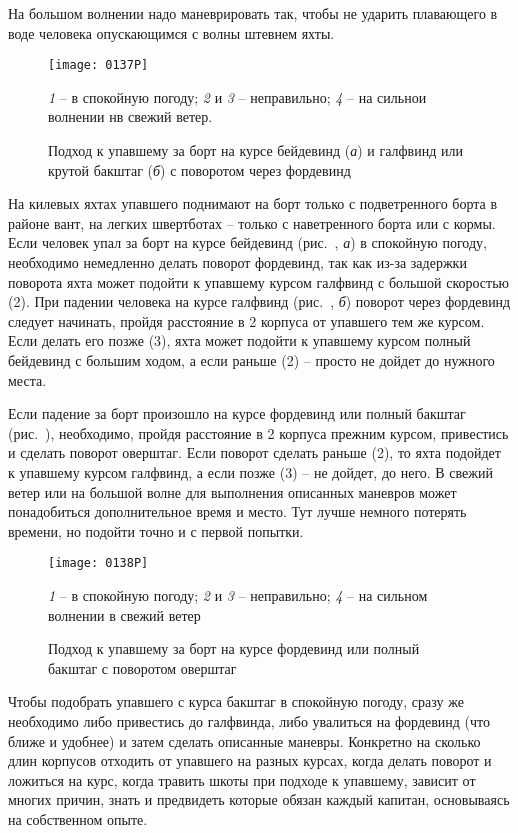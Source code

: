 На большом волнении надо маневрировать так, чтобы не ударить плавающего в воде человека опускающимся с волны штевнем яхты.

\begin{figure*}[htb]
  \centering{}
  \texttt{[image: 0137P]}
  \caption{Подход к упавшему за борт на курсе бейдевинд (\textit{а}) и галфвинд или крутой бакштаг (\textit{б}) с поворотом через фордевинд}
  \label{fig:137}
  \small
  \centering{}
  \textit{1} \--- в спокойную погоду; \textit{2} и \textit{3} \--- неправильно; \textit{4} \--- на сильнои волнении нв свежий ветер.
\end{figure*}

На килевых яхтах упавшего поднимают на борт только с подветренного борта в районе вант, на легких швертботах \--- только с наветренного борта или с кормы. Если человек упал за борт на курсе бейдевинд (рис.~, \textit{а}) в спокойную погоду, необходимо немедленно делать поворот фордевинд, так как из-за задержки поворота яхта может подойти к упавшему курсом галфвинд с большой скоростью (2). При падении человека на курсе галфвинд (рис.~, \textit{б}) поворот через фордевинд следует начинать, пройдя расстояние в 2 корпуса от упавшего тем же курсом. Если делать его позже (3), яхта может подойти к упавшему курсом полный бейдевинд с большим ходом, а если раньше (2) \--- просто не дойдет до нужного места.

Если падение за борт произошло на курсе фордевинд или полный бакштаг (рис.~), необходимо, пройдя расстояние в 2 корпуса прежним курсом, привестись и сделать поворот оверштаг. Если поворот сделать раньше (2), то яхта подойдет к упавшему курсом галфвинд, а если позже (3) \--- не дойдет, до него. В свежий ветер или на большой волне для выполнения описанных маневров может понадобиться дополнительное время и место. Тут лучше немного потерять времени, но подойти точно и с первой попытки.

\begin{figure}[htb]
  \centering{}
  \texttt{[image: 0138P]}
  \caption{Подход к упавшему за борт на курсе фордевинд или полный бакштаг с поворотом оверштаг}
  \label{fig:138}
  \small
  \centering{}
  \textit{1} \--- в спокойную погоду; \textit{2} и \textit{3} \--- неправильно; \textit{4} \--- на сильном волнении в свежий ветер
\end{figure}

Чтобы подобрать упавшего с курса бакштаг в спокойную погоду, сразу же необходимо либо привестись до галфвинда, либо увалиться на фордевинд (что ближе и удобнее) и затем сделать описанные маневры. Конкретно на сколько длин корпусов отходить от упавшего на разных курсах, когда делать поворот и ложиться на курс, когда травить шкоты при подходе к упавшему, зависит от многих причин, знать и предвидеть которые обязан каждый капитан, основываясь на собственном опыте. 

